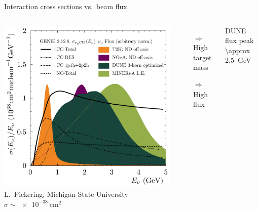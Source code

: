 \documentclass[]{beamer}
\newcommand*{\emphcol}{red}
\newcommand*{\dune}{{DUNE}}
\begin{document}
\begin{frame}{Interaction cross sections vs.\ beam flux}
	\begin{columns}[c]
		\centering
		\includegraphics[width=\textwidth]{nu-detection/flux_and_xsec_from_luke}\\
		{\tiny L.\ Pickering, Michigan State University}
		{\color{\emphcol} $\sigma \sim \SI{e-38}{\centi\metre\squared}$}
		\begin{itemize}
			\item[$\Rightarrow$] High target mass
			\item[$\Rightarrow$] High flux
		\end{itemize}
		{\color{\emphcol} \dune{} flux peak \SI{\approx 2.5}{\giga\electronvolt}}
	\end{columns}
\end{frame}
\end{document}
